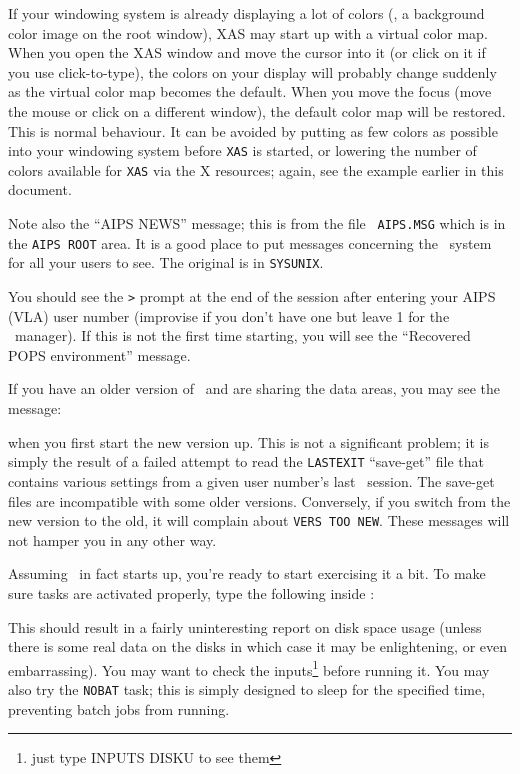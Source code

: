 If your windowing system is already displaying a lot of colors (\eg, a
background color image on the root window), XAS may start up with a
virtual color map.  When you open the XAS window and move the cursor into
it (or click on it if you use click-to-type), the colors on your display
will probably change suddenly as the virtual color map becomes the
default.  When you move the focus (move the mouse or click on a
different window), the default color map will be restored.  This is
normal behaviour.  It can be avoided by putting as few colors as
possible into your windowing system before {\tt XAS} is started, or
lowering the number of colors available for {\tt XAS} via the X
resources; again, see the example earlier in this document.

Note also the ``AIPS NEWS'' message; this is from the file {\tt
AIPS.MSG} which is in the {\tt\dol AIPS ROOT} area.  It is a good place
to put messages concerning the \AIPS\ system for all your users to
see.  The original is in {\tt\dol SYSUNIX}.

You should see the {\tt >} prompt at the end of the session after
entering your AIPS (VLA) user number (improvise if you don't have one
but leave 1 for the \AIPS\ manager).  If this is not the first time
starting, you will see the ``Recovered POPS environment'' message.

If you have an older version of \AIPS\ and are sharing the data areas, you
may see the message:\medskip

\medskip

\noindent when you first start the new version up.  This is not a
significant problem; it is simply the result of a failed attempt to read
the {\tt LASTEXIT} ``save-get'' file that contains various settings from a
given user number's last \AIPS\ session.  The {\tt\thisver} save-get files
are incompatible with some older versions.  Conversely, if you switch from
the new version to the old, it will complain about {\tt VERS TOO NEW}.
These messages will not hamper you in any other way.

\medskip{}

Assuming \AIPS\ in fact starts up, you're ready to start exercising it a
bit.  To make sure tasks are activated properly, type the following
inside \AIPS: \medskip

\medskip

\noindent This should result in a fairly uninteresting report on disk
space usage (unless there is some real data on the disks in which case
it may be enlightening, or even embarrassing).  You may want to check
the inputs\footnote*{\eightpoint just type INPUTS DISKU to see
                                 them}
before running it.  You may also try the {\tt NOBAT} task; this is
simply designed to sleep for the specified time, preventing batch jobs
from running.

